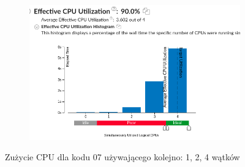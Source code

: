 \documentclass[12pt]{article}
\begin{document}
\begin{figure}[h!]
\begin{subfigure}[b]{0.32\linewidth}
		\includegraphics[width=\linewidth]{PR/07_04.png}
	\end{subfigure}
	\caption{Zużycie CPU dla kodu 07 używającego kolejno: 1, 2, 4 wątków}
\end{figure}
\end{document}
